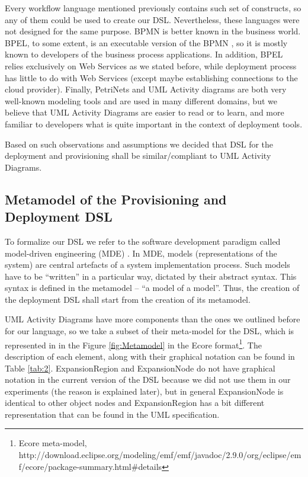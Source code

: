 \noindent Every workflow language mentioned previously contains such set of constructs, so any of them could be used to create our DSL. Nevertheless, these languages were not designed for the same purpose. BPMN is better known in the business world. BPEL, to some extent, is an executable version of the BPMN \cite{ouvans2006bpmn}, so it is mostly known to developers of the business process applications. In addition, BPEL relies exclusively on Web Services as we stated before, while deployment process has little to do with Web Services (except maybe establishing connections to the cloud provider). Finally, PetriNets and UML Activity diagrams are both very well-known modeling tools and are used in many different domains, but we believe that UML Activity Diagrams are easier to read or to learn, and more familiar to developers what is quite important in the context of deployment tools.

\noindent 

\noindent Based on such observations and assumptions we decided that DSL for the deployment and provisioning shall be similar/compliant to UML Activity Diagrams.

\subsection{Metamodel of the Provisioning and Deployment DSL}

\noindent To formalize our DSL we refer to the software development paradigm called model-driven engineering (MDE) \cite{kent2002model}. In MDE, models (representations of the system) are central artefacts of a system implementation process. Such models have to be ``written'' in a particular way, dictated by their abstract syntax. This syntax is defined in the metamodel -- ``a model of a model''. Thus, the creation of the deployment DSL shall start from the creation of its metamodel.

\noindent 

\noindent UML Activity Diagrams have more components than the ones we outlined before for our language, so we take a subset of their meta-model for the DSL, which is represented in in the Figure \ref{fig:Metamodel} in the Ecore format\footnote{ Ecore meta-model, $  $http://download.eclipse.org/modeling/emf/emf/javadoc/2.9.0/org/eclipse/emf/ecore/package-summary.html\#details}. The description of each element, along with their graphical notation can be found in Table \ref{tab:2}. ExpansionRegion and ExpansionNode do not have graphical notation in the current version of the DSL because we did not use them in our experiments (the reason is explained later), but in general ExpansionNode is identical to other object nodes and ExpansionRegion has a bit different representation that can be found in the UML specification.

